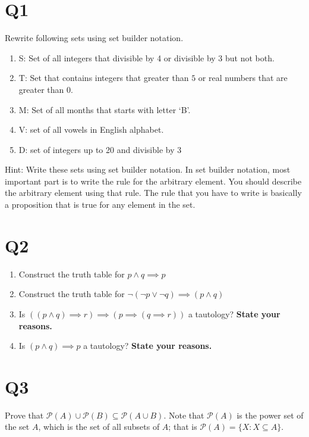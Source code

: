 \documentclass[12pt]{exam}
\begin{document}
\section{Q1}
Rewrite following sets using set builder notation.

\begin{enumerate}
    \item S: Set of all integers that divisible by 4 or divisible by 3 but not both.
    \item T: Set that contains integers that greater than $5$ or real numbers that are greater than 0.
    \item M: Set of all months that starts with letter `B'. 
    \item V: set of all vowels in English alphabet.
    \item D: set of integers up to 20 and divisible by 3
\end{enumerate}

Hint: Write these sets using set builder notation. In set builder notation, most important part is to write the rule for the arbitrary element. You should describe the arbitrary element using that rule. The rule that you have to write is basically a proposition that is true for any element in the set. 


\section{Q2}
\begin{enumerate}
    \item Construct the truth table for $p \wedge q \implies p$
    \item Construct the truth table for $\neg(\neg p \vee \neg q) \implies (p \wedge q)$
    \item Is $((p \wedge q)\implies r) \implies (p \implies (q \implies r))$ a tautology? \textbf{State your reasons.}
    \item Is $(p \wedge q) \implies p$ a tautology? \textbf{State your reasons.}
\end{enumerate}


\section{Q3}
Prove that $\mathcal{P}(A) \cup \mathcal{P}(B) \subseteq \mathcal{P}(A \cup B)$. Note that $\mathcal{P}(A)$ is the power set of the set $A$, which is the set of all subsets of $A$; that is $\mathcal{P}(A) = \{X: X \subseteq A\}$.
\end{document}
